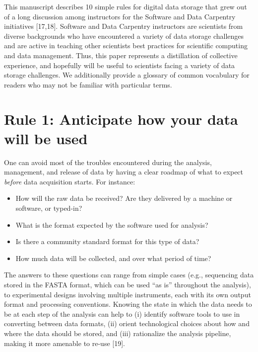 \documentclass[10pt,letterpaper]{article}
\providecommand{\tightlist}{%
  \setlength{\itemsep}{0pt}\setlength{\parskip}{0pt}
}
\begin{document}
This manuscript describes 10 simple rules for digital data storage that
grew out of a long discussion among instructors for the Software and
Data Carpentry initiatives {[}17,18{]}. Software and Data Carpentry
instructors are scientists from diverse backgrounds who have encountered
a variety of data storage challenges and are active in teaching other
scientists best practices for scientific computing and data management.
Thus, this paper represents a distillation of collective experience, and
hopefully will be useful to scientists facing a variety of data storage
challenges. We additionally provide a glossary of common vocabulary for
readers who may not be familiar with particular terms.

\section*{Rule 1: Anticipate how your data will be
used}\label{rule-1-anticipate-how-your-data-will-be-used}

One can avoid most of the troubles encountered during the analysis,
management, and release of data by having a clear roadmap of what to
expect \emph{before} data acquisition starts. For instance:

\begin{itemize}
\tightlist
\item
  How will the raw data be received? Are they delivered by a machine or
  software, or typed-in?
\item
  What is the format expected by the software used for analysis?
\item
  Is there a community standard format for this type of data?
\item
  How much data will be collected, and over what period of time?
\end{itemize}

The answers to these questions can range from simple cases (e.g.,
sequencing data stored in the FASTA format, which can be used ``as is''
throughout the analysis), to experimental designs involving multiple
instruments, each with its own output format and processing conventions.
Knowing the state in which the data needs to be at each step of the
analysis can help to (i) identify software tools to use in converting
between data formats, (ii) orient technological choices about how and
where the data should be stored, and (iii) rationalize the analysis
pipeline, making it more amenable to re-use {[}19{]}.
\end{document}
